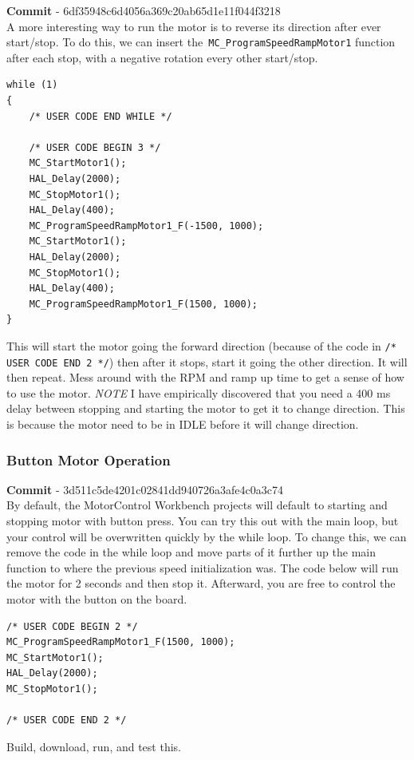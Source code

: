 \documentclass[10pt]{article}
\begin{document}
                \textbf{Commit} - 6df35948c6d4056a369c20ab65d1e11f044f3218 \\
                A more interesting way to run the motor is to reverse its direction after ever start/stop. To do this, we can insert the\texttt{ MC\_ProgramSpeedRampMotor1} function after each stop, with a negative rotation every other start/stop.
                \begin{verbatim}
while (1)
{
    /* USER CODE END WHILE */

    /* USER CODE BEGIN 3 */
    MC_StartMotor1();
    HAL_Delay(2000);
    MC_StopMotor1();
    HAL_Delay(400);
    MC_ProgramSpeedRampMotor1_F(-1500, 1000);
    MC_StartMotor1();
    HAL_Delay(2000);
    MC_StopMotor1();
    HAL_Delay(400);
    MC_ProgramSpeedRampMotor1_F(1500, 1000);
}
                \end{verbatim}
                This will start the motor going the forward direction (because of the code in \texttt{/* USER CODE END 2 */}) then after it stops, start it going the other direction. It will then repeat. Mess around with the RPM and ramp up time to get a sense of how to use the motor. \emph{NOTE} I have empirically discovered that you need a 400 ms delay between stopping and starting the motor to get it to change direction. This is because the motor need to be in IDLE before it will change direction.
			\FloatBarrier \subsubsection{Button Motor Operation}
                \textbf{Commit} - 3d511c5de4201c02841dd940726a3afe4c0a3c74 \\
                By default, the MotorControl Workbench projects will default to starting and stopping motor with button press. You can try this out with the main loop, but your control will be overwritten quickly by the while loop. To change this, we can remove the code in the while loop and move parts of it further up the main function to where the previous speed initialization was. The code below will run the motor for 2 seconds and then stop it. Afterward, you are free to control the motor with the button on the board.
                \begin{verbatim}
/* USER CODE BEGIN 2 */
MC_ProgramSpeedRampMotor1_F(1500, 1000);
MC_StartMotor1();
HAL_Delay(2000);
MC_StopMotor1();

/* USER CODE END 2 */
                \end{verbatim}
                Build, download, run, and test this. \\ 
\end{document}
